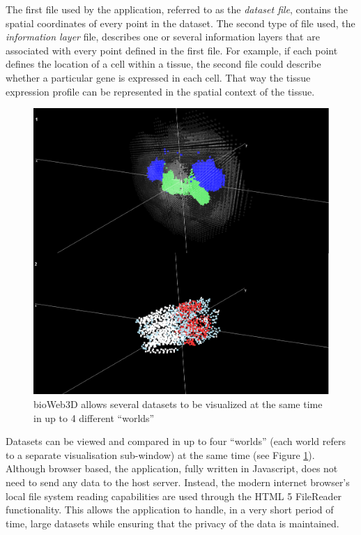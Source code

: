 The first file used by the application, referred to as the \emph{dataset file}, contains the spatial coordinates of every point in the dataset. The second type of file used, the \emph{information layer} file, describes one or several information layers that are associated with every point defined in the first file. For example, if each point defines the location of a cell within a tissue, the second file could describe whether a particular gene is expressed in each cell. That way the tissue expression profile can be represented in the spatial context of the tissue.\\

\begin{figure}[bth]
\begin{center}
  \includegraphics[width=0.8\linewidth]{gfx/chapter3/two_worlds.png}
\end{center}
  \caption{bioWeb3D allows several datasets to be visualized at the same time in up to 4 different ``worlds''}
  \label{fig:2worlds}
\end{figure}

Datasets can be viewed and compared in up to four ``worlds'' (each world refers to a separate visualisation sub-window) at the same time (see Figure \ref{fig:2worlds}). Although browser based, the application, fully written in Javascript, does not need to send any data to the host server. Instead, the modern internet browser's local file system reading capabilities are used through the HTML 5 FileReader functionality. This allows the application to handle, in a very short period of time, large datasets while ensuring that the privacy of the data is maintained.\\

